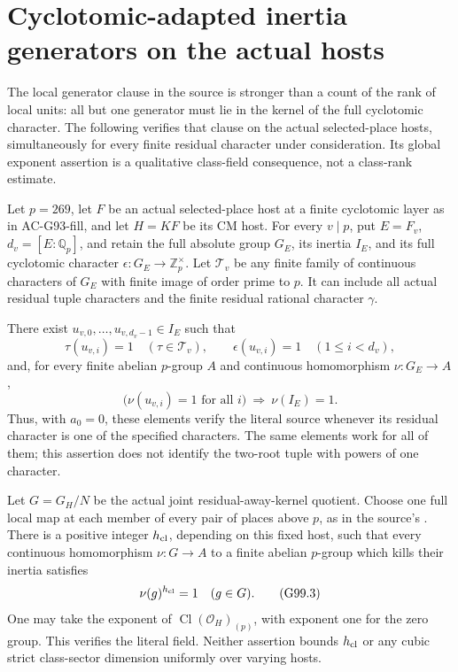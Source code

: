 \section{Cyclotomic-adapted inertia generators on the actual hosts}
\label{sec:cubic-frame-generators}

The local generator clause in the source is stronger than a count of
the rank of local units: all but one generator must lie in the kernel
of the full cyclotomic character.  The following verifies that clause
on the actual selected-place hosts, simultaneously for every finite
residual character under consideration.  Its global exponent assertion
is a qualitative class-field consequence, not a class-rank estimate.

\begin{proposition}
\label{AC-G99-frame}
Let \(p=269\), let \(F\) be an actual selected-place host at a finite
cyclotomic layer as in AC-G93-fill, and let \(H=KF\) be its CM host.
For every \(v\mid p\), put \(E=F_v\), \(d_v=[E:\mathbb Q_p]\),
and retain the full absolute group \(G_E\), its inertia \(I_E\),
and its full cyclotomic character \(\epsilon:G_E\to\mathbb Z_p^\times\).
Let \(\mathcal T_v\) be any finite family of continuous characters
of \(G_E\) with finite image of order prime to \(p\).  It can include
all actual residual tuple characters and the finite residual rational character
\(\gamma\).

There exist \(u_{v,0},\ldots,u_{v,d_v-1}\in I_E\) such that
\[
 \tau(u_{v,i})=1\quad(\tau\in\mathcal T_v),\qquad
 \epsilon(u_{v,i})=1\quad(1\le i<d_v),                 \tag{G99.1}
\]
and, for every finite abelian \(p\)-group \(A\) and continuous
homomorphism \(\nu:G_E\to A\),
\[
 \bigl(\nu(u_{v,i})=1\text{ for all }i\bigr)
       \ \Longrightarrow\ \nu(I_E)=1.                \tag{G99.2}
\]
Thus, with \(a_0=0\), these elements verify the literal source
 whenever its residual character is one of
the specified characters.  The same elements work for all of them;
this assertion does not identify the two-root tuple with powers of
one character.

Let \(G=G_H/N\) be the actual joint residual-away-kernel quotient.
Choose one full local map at each member of every pair of places
above \(p\), as in the source's .  There is a positive
integer \(h_{\rm cl}\), depending on this fixed host, such that every
continuous homomorphism \(\nu:G\to A\) to a finite abelian
\(p\)-group which kills their inertia satisfies
\[
                         \nu(g)^{h_{\rm cl}}=1
                         \quad(g\in G).              \tag{G99.3}
\]
One may take the exponent of
\(\operatorname{Cl}(\mathcal O_H)_{(p)}\), with exponent one for
the zero group.  This verifies the literal 
field.  Neither assertion bounds \(h_{\rm cl}\) or any cubic
strict class-sector dimension uniformly over varying hosts.
\end{proposition}

